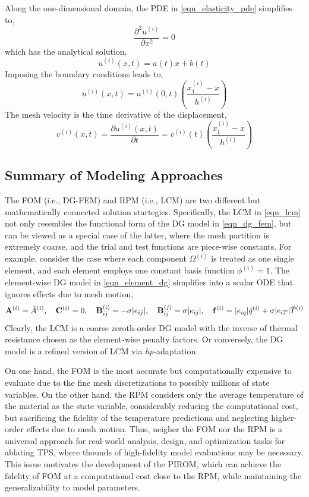 Along the one-dimensional domain, the PDE in \cref{eqn_elasticity_pde} simplifies to,
\begin{equation}
    \frac{\partial^2 u^{(i)}}{\partial x^2} = 0
\end{equation}
which has the analytical solution,
\begin{equation}
    u^{(i)}(x,t) = a(t)x + b(t)
\end{equation}
Imposing the boundary conditions leads to,
\begin{equation}
    u^{(i)}(x,t) = u^{(i)}(0,t)\left(\frac{x_1^{(i)} - x}{h^{(i)}}\right)
\end{equation}
The mesh velocity is the time derivative of the displacement,
\begin{equation}
    v^{(i)}(x,t) = \frac{\partial u^{(i)}(x,t)}{\partial t} = v^{(i)}(t)\left(\frac{x_1^{(i)} - x}{h^{(i)}}\right)
\end{equation}

\subsection{Summary of Modeling Approaches}

The FOM (i.e., DG-FEM) and RPM (i.e., LCM) are two different but mathematically connected solution startegies. Specifically, the LCM in \cref{eqn_lcm} not only resembles the functional form of the DG model in \cref{eqn_dg_fem}, but can be viewed as a special case of the latter, where the mesh partition is extremely coarse, and the trial and test functions are piece-wise constants. For example, consider the case where each component $\Omega^{(i)}$ is treated as one single element, and each element employs one constant basis function $\phi^{(i)}=1$. The element-wise DG model in \cref{eqn_element_dg} simplifies into a scalar ODE that ignores effects due to mesh motion,
\begin{equation}
    \mathbf{A}^{(i)} = \bar{A}^{(i)},\quad \mathbf{C}^{(i)} = 0, \quad\mathbf{B}^{(i)}_{ij} = -\sigma|e_{ij}|,\quad \mathbf{B}^{(j)}_{ij}=\sigma|e_{ij}|,\quad \mathbf{f}^{(i)} = |e_{iq}|\bar{q}^{(i)} + \sigma|e_{iT}|\bar{T}^{(i)}
\end{equation}
Clearly, the LCM is a coarse zeroth-order DG model with the inverse of thermal resistance chosen as the element-wise penalty factors. Or conversely, the DG model is a refined version of LCM via \textit{hp}-adaptation.

On one hand, the FOM is the most accurate but computationally expensive to evaluate due to the fine mesh discretizations to possibly millions of state variables. On the other hand, the RPM considers only the average temperature of the material as the state variable, considerably reducing the computational cost, but sacrificing the fidelity of the temperature predictiona and neglecting higher-order effects due to mesh motion. Thus, neigher the FOM nor the RPM is a universal approach for real-world analysis, design, and optimization tasks for ablating TPS, where thounds of high-fidelity model evaluations may be necessary. This issue motivates the development of the PIROM, which can achieve the fidelity of FOM at a computational cost close to the RPM, while maintaining the generalizability to model parameters.



